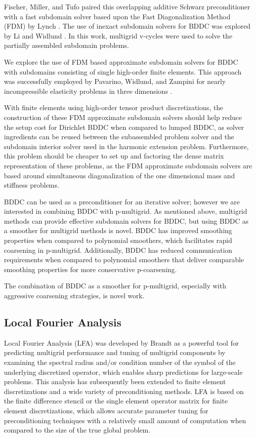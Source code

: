 Fischer, Miller, and Tufo \cite{fischer2000overlapping} paired this overlapping additive Schwarz preconditioner with a fast subdomain solver based upon the Fast Diagonalization Method (FDM) by Lynch \cite{lynch1964direct}.
The use of inexact subdomain solvers for BDDC was explored by Li and Widlund \cite{li2007use}.
In this work, multigrid v-cycles were used to solve the partially assembled subdomain problems.

We explore the use of FDM based approximate subdomain solvers for BDDC with subdomains consisting of single high-order finite elements.
This approach was successfully employed by Pavarino, Widlund, and Zampini for nearly incompressible elasticity problems in three dimensions \cite{pavarino2010bddc}.

With finite elements using high-order tensor product discretizations, the construction of these FDM approximate subdomain solvers should help reduce the setup cost for Dirichlet BDDC when compared to lumped BDDC, as solver ingredients can be reused between the subassembled problem solver and the subdomain interior solver used in the harmonic extension problem.
Furthermore, this problem should be cheaper to set up and factoring the dense matrix representation of these problems, as the FDM approximate subdomain solvers are based around simultaneous diagonalization of the one dimensional mass and stiffness problems.

BDDC can be used as a preconditioner for an iterative solver; however we are interested in combining BDDC with p-multigrid.
As mentioned above, multigrid methods can provide effective subdomain solvers for BDDC, but using BDDC as a smoother for multigrid methods is novel.
BDDC has improved smoothing properties when compared to polynomial smoothers, which facilitates rapid coarsening in p-multigrid.
Additionally, BDDC has reduced communication requirements when compared to polynomial smoothers that deliver comparable smoothing properties for more conservative p-coarsening.

The combination of BDDC as a smoother for p-multigrid, especially with aggressive coarsening strategies, is novel work.

\subsection{Local Fourier Analysis}

Local Fourier Analysis (LFA) was developed by Brandt \cite{brandt1977multi,wienands2004practical} as a powerful tool for predicting multigrid performance and tuning of multigrid components by examining the spectral radius and/or condition number of the symbol of the underlying discretized operator, which enables sharp predictions for large-scale problems.
This analysis has subsequently been extended to finite element discretizations and a wide variety of preconditioning methods.
LFA is based on the finite difference stencil or the single element operator matrix for finite element discretizations, which allows accurate parameter tuning for preconditioning techniques with a relatively small amount of computation when compared to the size of the true global problem.

